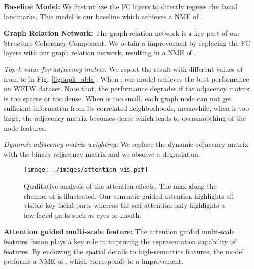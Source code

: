 \documentclass[runningheads]{llncs}
\begin{document}
\textbf{Baseline Model:} We first utilize the FC layers to directly regress the facial landmarks. This model is our baseline which achieves a NME of .

\textbf{Graph Relation Network:}
The graph relation network is a key part of our Structure Coherency Component. 
We obtain a  improvement by replacing the FC layers with our graph relation network, resulting in a NME of .


\textit{Top-k value for adjacency matrix:}
We report the result with different values of  from  to  in Fig. \ref{fig:topk_abla}. When , our model achieves the best performance on WFLW dataset. Note that, the performance degrades if the adjacency matrix is too sparse or too dense. When  is too small, each graph node can not get sufficient information from its correlated neighborhoods, meanwhile, when  is too large, the adjacency matrix becomes dense which leads to oversmoothing of the node features.

\textit{Dynamic adjacency matrix weighting:} 
We replace the dynamic adjacency matrix with the binary adjacency matrix  and we observe a  degradation.



\begin{table}[t]
\centering
\caption{NME(\%) comparison with different values of .  is for building adjacency matrix.}
\label{fig:topk_abla}
\end{table}




\begin{figure}[t]
	\centering
	\texttt{[image: ./images/attention\_vis.pdf]}
	\caption{Qualitative analysis of the attention effects. The max along the channel of  is illustrated. Our semantic-guided attention highlights all visible key facial parts whereas the self-attention only highlights a few facial parts such as eyes or mouth.}
	\label{fig:attention_vis}
\end{figure}

\textbf{Attention guided multi-scale feature:} 
The attention guided multi-scale features fusion plays a key role in improving the representation capability of features. 
By endowing the spatial details to high-semantics features, the model performs a NME of , which corresponds to a  improvement. 
\end{document}
